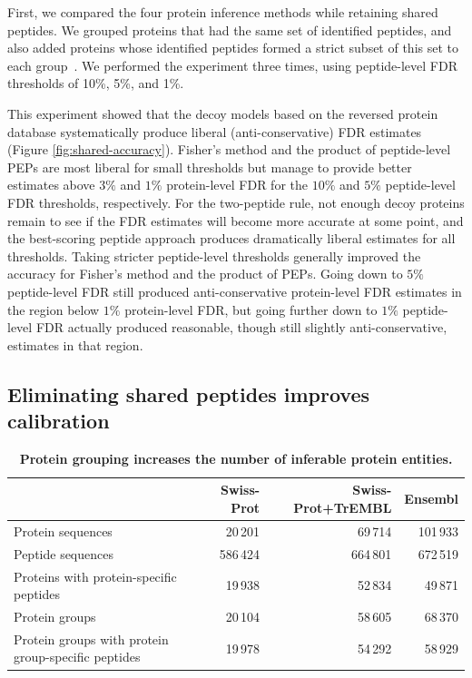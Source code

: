 \documentclass{article}
\begin{document}
First, we compared the four protein inference methods while retaining
shared peptides. We grouped proteins that had the same set of
identified peptides, and also added proteins whose identified peptides
formed a strict subset of this set to each
group~\cite{nesvizhskii2005interpretation, serang2012review}.  We
performed the experiment three times, using peptide-level FDR
thresholds of 10\%, 5\%, and 1\%.

This experiment showed that the decoy models based on the reversed
protein database systematically produce liberal (anti-conservative)
FDR estimates (Figure \ref{fig:shared-accuracy}). Fisher's method and
the product of peptide-level PEPs are most liberal for small
thresholds but manage to provide better estimates above $3\%$ and
$1\%$ protein-level FDR for the $10\%$ and $5\%$ peptide-level FDR
thresholds, respectively. For the two-peptide rule, not enough decoy
proteins remain to see if the FDR estimates will become more accurate
at some point, and the best-scoring peptide approach produces
dramatically liberal estimates for all thresholds. Taking stricter
peptide-level thresholds generally improved the accuracy for Fisher's
method and the product of PEPs. Going down to $5\%$ peptide-level FDR
still produced anti-conservative protein-level FDR estimates in the
region below $1\%$ protein-level FDR, but going further down to $1\%$
peptide-level FDR actually produced reasonable, though still slightly
anti-conservative, estimates in that region.

\subsection*{Eliminating shared peptides improves calibration}

\begin{table}
\caption{\label{tab:duplicate-proteins}\textbf{Protein grouping
    increases the number of inferable protein entities.}}
\scriptsize
\begin{center}
\begin{tabular}{lrrr}
\hline
& Swiss-Prot & Swiss-Prot+TrEMBL & Ensembl\\
\hline
Protein sequences & 20\,201 & 69\,714 & 101\,933\\
Peptide sequences & 586\,424 & 664\,801 & 672\,519\\
Proteins with protein-specific peptides & 19\,938 & 52\,834 &
49\,871\\
Protein groups & 20\,104 & 58\,605 & 68\,370\\
Protein groups with protein group-specific peptides & 19\,978 &
54\,292 & 58\,929\\
\hline
\end{tabular}
\end{center}
\end{table}
\end{document}
